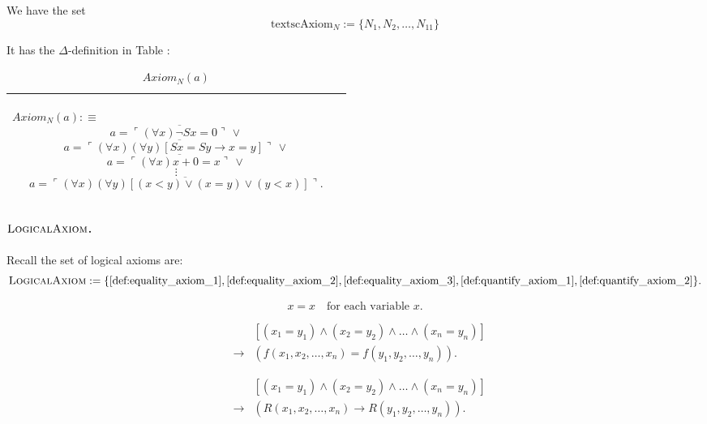 \documentclass[11pt,letterpaper]{book}
\theoremstyle{definition}
\begin{document}
We have the set
$$ \text{textsc{Axiom}}_N := \{ N_1, N_2, \ldots, N_{11} \} $$

It has the $\Delta$-definition in Table :

\begin{table}[h]
\caption{$Axiom_N (a)$}
\label{box:axiom_N}
\begin{tabular}{|p{0.9\linewidth}|}
\hline
\rule{0pt}{3ex}
\begin{center}
$Axiom_N (a) : \equiv $
$$ a = \overline{\ulcorner (\forall x) \lnot S x = 0 \urcorner }\, \lor $$
$$a = \overline{ \ulcorner (\forall x)(\forall y) [Sx = Sy \rightarrow x = y] \urcorner }\, \lor $$
$$ a = \overline{ \ulcorner (\forall x) x + 0 = x  \urcorner } \, \lor $$
$$ \vdots $$
$$  a = \overline{ \ulcorner (\forall x)(\forall y) [(x<y) \lor (x = y) \lor (y < x) ]  \urcorner }  . $$
\end{center}\\
\hline
\end{tabular}
\end{table}


\paragraph{$\text{\textsc{LogicalAxiom}}$.}

Recall the set of logical axioms are:
$$ \text{\textsc{LogicalAxiom}} := \{  \ref{def:equality_axiom_1}, \ref{def:equality_axiom_2}, \ref{def:equality_axiom_3}, \ref{def:quantify_axiom_1}, \ref{def:quantify_axiom_2} \}. $$


\begin{equation}
x=x \quad \text{for each variable } x. \tag{E1}
\end{equation}

\begin{equation}
\begin{aligned}
& & [(x_1 = y_1) \land (x_2=y_2) \land \ldots \land (x_n=y_n) ]  \\
& \rightarrow & ( f(x_1, x_2, \ldots, x_n) = f(y_1, y_2, \ldots, y_n) ).
\end{aligned}\tag{E2}
\end{equation}

\begin{equation}
\begin{aligned}
& & [(x_1 = y_1) \land (x_2=y_2) \land \ldots \land (x_n=y_n) ]  \\
& \rightarrow & ( R(x_1, x_2, \ldots, x_n) \rightarrow R(y_1, y_2,
\ldots, y_n) ).
\end{aligned}\tag{E3}
\end{equation}
\end{document}

